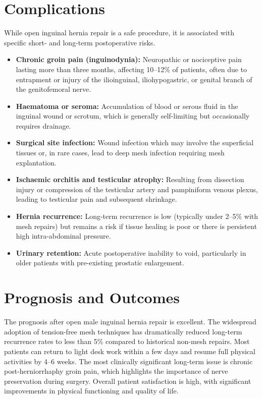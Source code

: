 \section*{Complications}
While open inguinal hernia repair is a safe procedure, it is associated with specific short- and long-term postoperative risks.
\begin{itemize}
    \item \textbf{Chronic groin pain (inguinodynia):} Neuropathic or nociceptive pain lasting more than three months, affecting 10--12\% of patients, often due to entrapment or injury of the ilioinguinal, iliohypogastric, or genital branch of the genitofemoral nerve.
    \item \textbf{Haematoma or seroma:} Accumulation of blood or serous fluid in the inguinal wound or scrotum, which is generally self-limiting but occasionally requires drainage.
    \item \textbf{Surgical site infection:} Wound infection which may involve the superficial tissues or, in rare cases, lead to deep mesh infection requiring mesh explantation.
    \item \textbf{Ischaemic orchitis and testicular atrophy:} Resulting from dissection injury or compression of the testicular artery and pampiniform venous plexus, leading to testicular pain and subsequent shrinkage.
    \item \textbf{Hernia recurrence:} Long-term recurrence is low (typically under 2--5\% with mesh repairs) but remains a risk if tissue healing is poor or there is persistent high intra-abdominal pressure.
    \item \textbf{Urinary retention:} Acute postoperative inability to void, particularly in older patients with pre-existing prostatic enlargement.
\end{itemize}

\section*{Prognosis and Outcomes}
The prognosis after open male inguinal hernia repair is excellent. The widespread adoption of tension-free mesh techniques has dramatically reduced long-term recurrence rates to less than 5\% compared to historical non-mesh repairs. Most patients can return to light desk work within a few days and resume full physical activities by 4--6 weeks. The most clinically significant long-term issue is chronic post-herniorrhaphy groin pain, which highlights the importance of nerve preservation during surgery. Overall patient satisfaction is high, with significant improvements in physical functioning and quality of life.

